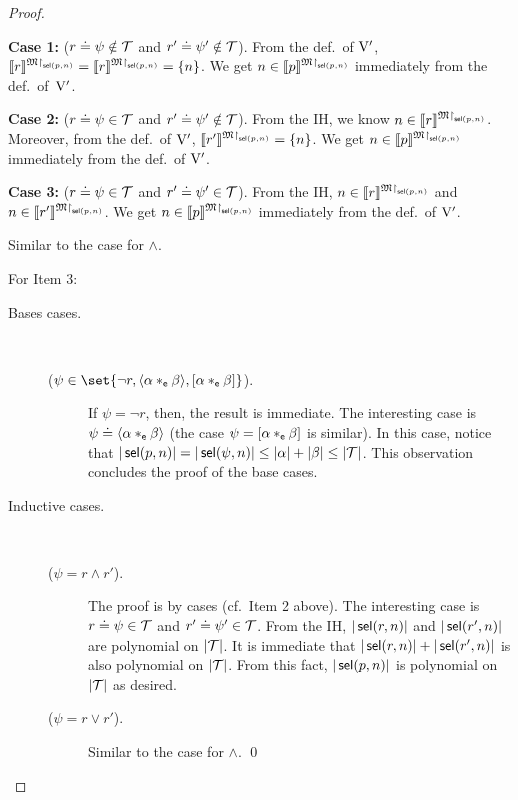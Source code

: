\begin{proof}
\begin{description}
\begin{description}
                {\bf Case 1:} (${r \doteq \psi} \notin \mathcal{T}$ and ${r' \doteq \psi'} \notin \mathcal{T}$). 
                From the def.~of $\mathrm{V}'$, $\llbracket{r}\rrbracket^{\mathfrak{M}{\restriction}_{\operatorname{\mathsf{sel}}(p,n)}} = \llbracket{r}\rrbracket^{\mathfrak{M}{\restriction}_{\operatorname{\mathsf{sel}}(p,n)}} = \{n\}$.
                We get $n \in \llbracket{p}\rrbracket^{\mathfrak{M}{\restriction}_{\operatorname{\mathsf{sel}}(p,n)}}$ immediately from the def.~of~$\mathrm{V}'$.

                {\bf Case 2:} (${r \doteq \psi} \in \mathcal{T}$ and ${r' \doteq \psi'} \notin \mathcal{T}$). 
                From the IH, we know $n \in \llbracket{r}\rrbracket^{\mathfrak{M}{\restriction}_{\operatorname{\mathsf{sel}}(p,n)}}$.
                Moreover, from the def.~of $\mathrm{V}'$, $\llbracket{r'}\rrbracket^{\mathfrak{M}{\restriction}_{\operatorname{\mathsf{sel}}(p,n)}} = \{n\}$.
                We get $n \in \llbracket{p}\rrbracket^{\mathfrak{M}{\restriction}_{\operatorname{\mathsf{sel}}(p,n)}}$ immediately from the def.~of $\mathrm{V}'$.

                {\bf Case 3:} (${r \doteq \psi} \in \mathcal{T}$ and ${r' \doteq \psi'} \in \mathcal{T}$). 
                From the IH, $n \in \llbracket{r}\rrbracket^{\mathfrak{M}{\restriction}_{\operatorname{\mathsf{sel}}(p,n)}}$ and $n \in \llbracket{r'}\rrbracket^{\mathfrak{M}{\restriction}_{\operatorname{\mathsf{sel}}(p,n)}}$.
                We get $n \in \llbracket{p}\rrbracket^{\mathfrak{M}{\restriction}_{\operatorname{\mathsf{sel}}(p,n)}}$ immediately from the def.~of $\mathrm{V}'$.
            \item[($\psi = r \lor r'$).] Similar to the case for $\land$.
            \end{description}
    \end{description}

    For Item 3:
    \begin{description}
        \item[Bases cases.] \
        \begin{description}
            \item[($\psi\in\set{\lnot r, \tup{\alpha*_\cmp\beta},[\alpha*_\cmp\beta]}$).]
            If $\psi = \lnot r$, then, the result is immediate. 
            The interesting case is $\psi \doteq \langle{\alpha*_{\mathsf{e}}\beta}\rangle$ (the case $\psi = [\alpha *_{\mathsf{e}} \beta]$ is similar).
            In this case, notice that $|\operatorname{\mathsf{sel}}(p,n)| = |\operatorname{\mathsf{sel}}(\psi,n)| \leq |\alpha|+|\beta| \leq |\mathcal{T}|$.
            This observation concludes the proof of the base cases.
        \end{description}
        \item[Inductive cases.] \
            \begin{description}
                \item[($\psi = r \land r'$).] The proof is by cases (cf.~Item 2 above).
                The interesting case is ${r \doteq \psi} \in \mathcal{T}$ and ${r' \doteq \psi'} \in \mathcal{T}$. 
                From the IH, $|\operatorname{\mathsf{sel}}(r,n)|$ and $|\operatorname{\mathsf{sel}}(r',n)|$ are polynomial on $|\mathcal{T}|$.
                It is immediate that $|\operatorname{\mathsf{sel}}(r,n)|+|\operatorname{\mathsf{sel}}(r',n)|$ is also polynomial on $|\mathcal{T}|$.
                From this fact, $|\operatorname{\mathsf{sel}}(p,n)|$ is polynomial on $|\mathcal{T}|$ as desired.
            \item[($\psi = r \lor r'$).] Similar to the case for $\land$. \qed
            \end{description}
    \end{description}
\end{proof}

